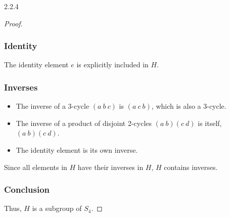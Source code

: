 \documentclass[12pt]{amsart}
\theoremstyle{definition}
\numberwithin{equation}{section}
\begin{document}
\begin{exercise}{2.2.4}
\begin{proof}
    \subsubsection*{Identity}
    The identity element \(e\) is explicitly included in \(H\).
    
    \subsubsection*{Inverses}
    \begin{itemize}[label=--]
        \item The inverse of a 3-cycle \((a \ b \ c)\) is \((a \ c \ b)\), which is also a 3-cycle.
        \item The inverse of a product of disjoint 2-cycles \((a \ b)(c \ d)\) is itself, \((a \ b)(c \ d)\).
        \item The identity element is its own inverse.
    \end{itemize}
    
    Since all elements in \(H\) have their inverses in \(H\), \(H\) contains inverses.
    
    \subsubsection*{Conclusion}
    Thus, \(H\) is a subgroup of \(S_4\).
    
    \end{proof}
    \end{exercise}
    \newpage
    
\end{document}

